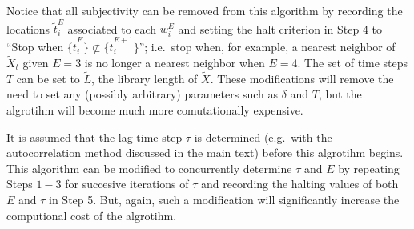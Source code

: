 \documentclass[a4paper,11pt]{article}
\begin{document}
Notice that all subjectivity can be removed from this algorithm by recording the locations $\tilde{t}^E_i$ associated to each $w^E_i$ and setting the halt criterion in Step 4 to ``Stop when $\{\tilde{t}^E_i\}\not \subset \{\tilde{t}^{E+1}_i\}$''; i.e.\ stop when, for example, a nearest neighbor of $\tilde{X}_t$ given $E=3$ is no longer a nearest neighbor when $E=4$.  The set of time steps $T$ can be set to $\tilde{L}$, the library length of $\tilde{X}$.  These modifications will remove the need to set any (possibly arbitrary) parameters such as $\delta$ and $T$, but the algrotihm will become much more comutationally expensive.

It is assumed that the lag time step $\tau$ is determined (e.g.\ with the autocorrelation method discussed in the main text) before this algrotihm begins.  This algorithm can be modified to concurrently determine $\tau$ and $E$ by repeating Steps $1-3$ for succesive iterations of $\tau$ and recording the halting values of both $E$ and $\tau$ in Step 5.  But, again, such a modification will significantly increase the computional cost of the algrotihm.
\end{document}
